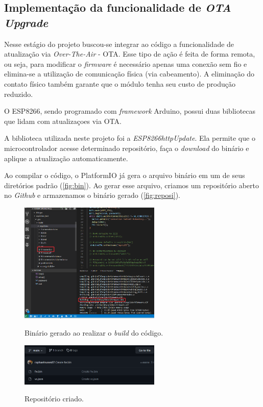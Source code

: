 \subsection{Implementação da funcionalidade de \textit{OTA Upgrade}}

Nesse estágio do projeto buscou-se integrar ao código a funcionalidade de atualização via \textit{Over-The-Air} - OTA. Esse tipo de ação é feita de forma remota, ou seja, para modificar o \textit{firmware} é necessário apenas uma conexão sem fio e elimina-se a utilização de comunicação física (via cabeamento). A eliminação do contato físico também garante que o módulo tenha seu custo de produção reduzido.

O ESP8266, sendo programado com \textit{framework} Arduino, possui duas bibliotecas que lidam com atualizaçoes via OTA.

A biblioteca utilizada neste projeto foi a \textit{ESP8266httpUpdate}. Ela permite que o microcontrolador acesse determinado repositório, faça o \textit{download} do binário e aplique a atualização automaticamente.

Ao compilar o código, o PlatformIO já gera o arquivo binário em um de seus diretórios padrão (\autoref{fig:bin}). Ao gerar esse arquivo, criamos um repositório aberto no \textit{Github} e armazenamos o binário gerado (\autoref{fig:reposi}).


\begin{figure}[H]
	\centering
	\caption{Binário gerado ao realizar o \textit{build} do código.}
	\includegraphics[width=0.6\textwidth]{figuras/platformio_bin.png}
	\label{fig:bin}
\end{figure}


\begin{figure}[H]
	\centering
	\caption{Repositório criado.}
	\includegraphics[width=0.6\textwidth]{figuras/repositorio_bin.png}
	\label{fig:reposi}
\end{figure}



